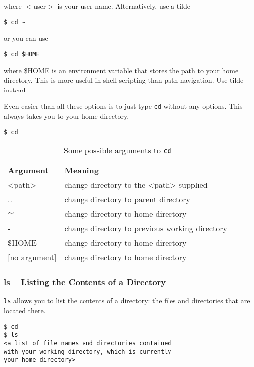 \documentclass[11pt]{cselabheader}
\begin{document}
where $<$user$>$ is your user name. Alternatively, use a tilde
\begin{lstlisting}[style=bash]
$ cd ~
\end{lstlisting}

or you can use
\begin{lstlisting}[style=bash]
$ cd $HOME
\end{lstlisting}

where \$HOME is an environment variable that stores the path to your
home directory. This is more useful in shell scripting than path
navigation. Use tilde instead.

Even easier than all these options is to just type \texttt{cd} without any
options. This always takes you to your home directory.
\begin{lstlisting}[style=bash]
$ cd
\end{lstlisting}

\begin{table}[!ht]
  \centering
  \begin{tabular}{ll}
    \toprule
      \bfseries Argument & \bfseries Meaning\\
    \midrule
      <path>    & change directory to the <path> supplied \\
      ..        & change directory to parent directory \\
      $\sim$    & change directory to home directory \\
      -         & change directory to previous working directory \\
      \$HOME    & change directory to home directory \\
      {[}no argument{]} & change directory to home directory \\
    \bottomrule
  \end{tabular}
  \caption{Some possible arguments to \texttt{cd}}
\end{table}

\subsubsection{ls -- Listing the Contents of a Directory}
\texttt{ls} allows you to list the contents of a directory: the files and
directories that are located there.

\begin{lstlisting}[style=bash]
$ cd
$ ls
<a list of file names and directories contained 
with your working directory, which is currently
your home directory>
\end{lstlisting}
\end{document}

